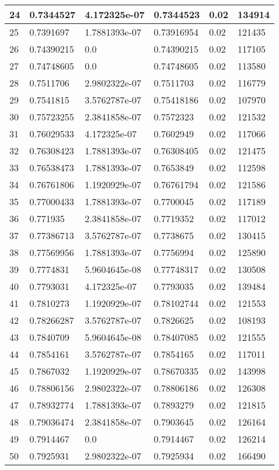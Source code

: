 \begin{longtable}{|l|l|l|l|l|l|}
24 & 0.7344527 & 4.172325e-07 & 0.7344523 & 0.02 & 134914 \\ \hline 
25 & 0.7391697 & 1.7881393e-07 & 0.73916954 & 0.02 & 121435 \\ \hline 
26 & 0.74390215 & 0.0 & 0.74390215 & 0.02 & 117105 \\ \hline 
27 & 0.74748605 & 0.0 & 0.74748605 & 0.02 & 113580 \\ \hline 
28 & 0.7511706 & 2.9802322e-07 & 0.7511703 & 0.02 & 116779 \\ \hline 
29 & 0.7541815 & 3.5762787e-07 & 0.75418186 & 0.02 & 107970 \\ \hline 
30 & 0.75723255 & 2.3841858e-07 & 0.7572323 & 0.02 & 121532 \\ \hline 
31 & 0.76029533 & 4.172325e-07 & 0.7602949 & 0.02 & 117066 \\ \hline 
32 & 0.76308423 & 1.7881393e-07 & 0.76308405 & 0.02 & 121475 \\ \hline 
33 & 0.76538473 & 1.7881393e-07 & 0.7653849 & 0.02 & 112598 \\ \hline 
34 & 0.76761806 & 1.1920929e-07 & 0.76761794 & 0.02 & 121586 \\ \hline 
35 & 0.77000433 & 1.7881393e-07 & 0.7700045 & 0.02 & 117189 \\ \hline 
36 & 0.771935 & 2.3841858e-07 & 0.7719352 & 0.02 & 117012 \\ \hline 
37 & 0.77386713 & 3.5762787e-07 & 0.7738675 & 0.02 & 130415 \\ \hline 
38 & 0.77569956 & 1.7881393e-07 & 0.7756994 & 0.02 & 125890 \\ \hline 
39 & 0.7774831 & 5.9604645e-08 & 0.77748317 & 0.02 & 130508 \\ \hline 
40 & 0.7793031 & 4.172325e-07 & 0.7793035 & 0.02 & 139484 \\ \hline 
41 & 0.7810273 & 1.1920929e-07 & 0.78102744 & 0.02 & 121553 \\ \hline 
42 & 0.78266287 & 3.5762787e-07 & 0.7826625 & 0.02 & 108193 \\ \hline 
43 & 0.7840709 & 5.9604645e-08 & 0.78407085 & 0.02 & 121555 \\ \hline 
44 & 0.7854161 & 3.5762787e-07 & 0.7854165 & 0.02 & 117011 \\ \hline 
45 & 0.7867032 & 1.1920929e-07 & 0.78670335 & 0.02 & 143998 \\ \hline 
46 & 0.78806156 & 2.9802322e-07 & 0.78806186 & 0.02 & 126308 \\ \hline 
47 & 0.78932774 & 1.7881393e-07 & 0.7893279 & 0.02 & 121815 \\ \hline 
48 & 0.79036474 & 2.3841858e-07 & 0.7903645 & 0.02 & 126164 \\ \hline 
49 & 0.7914467 & 0.0 & 0.7914467 & 0.02 & 126214 \\ \hline 
50 & 0.7925931 & 2.9802322e-07 & 0.7925934 & 0.02 & 166490 \\ \hline 
\end{longtable}